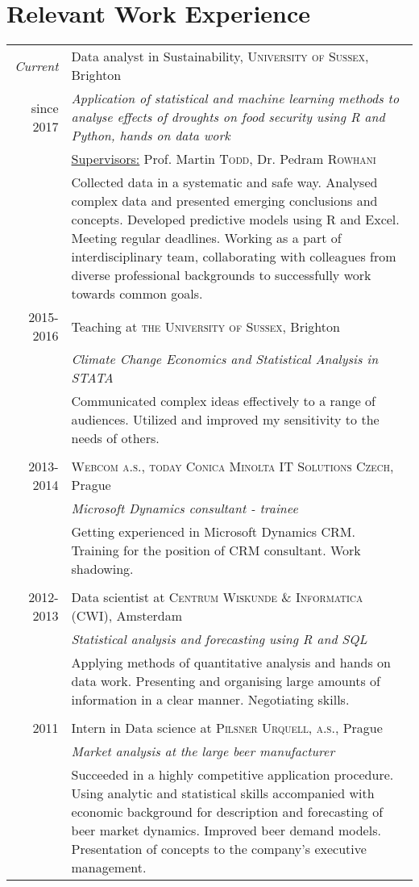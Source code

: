 \documentclass[a4paper,10pt]{article}
\begin{document}
\section{Relevant Work Experience}
\begin{tabular}{r|p{11cm}}
 \emph{Current} & Data analyst in Sustainability, \textsc{University of Sussex}, Brighton \\since \textsc{2017}&\emph{Application of statistical and machine learning methods to analyse effects of droughts on food security using R and Python, hands on data work}\\
& \underline{Supervisors:} Prof. Martin \textsc{Todd}, Dr. Pedram \textsc{Rowhani}\\
 &\footnotesize{Collected data in a systematic and safe way. Analysed complex data and presented emerging conclusions and concepts. Developed predictive models using R and Excel. Meeting regular deadlines. Working as a part of interdisciplinary team, collaborating with colleagues from diverse professional backgrounds to successfully work towards common goals.}

\\ \textsc{2015-2016} & Teaching at \textsc{the University of Sussex}, Brighton \\&\emph{Climate Change Economics and Statistical Analysis in STATA}\\&\footnotesize{Communicated complex ideas effectively to a range of audiences. Utilized and improved my sensitivity to the needs of others.}\\\multicolumn{2}{c}{} \\
 
  \textsc{2013-2014} &\textsc{Webcom a.s., today Conica Minolta IT Solutions Czech}, Prague\\ &\emph{Microsoft Dynamics consultant - trainee}\\&\footnotesize{Getting experienced in Microsoft Dynamics CRM. Training for the position of CRM consultant. Work shadowing.}\\\multicolumn{2}{c}{} \\


 \textsc{2012-2013} & Data scientist at \textsc{Centrum Wiskunde \& Informatica (CWI)}, Amsterdam\\ &\emph{Statistical analysis and forecasting using R and SQL}\\&\footnotesize{Applying methods of quantitative analysis and hands on data work. Presenting and organising large amounts of information in a clear manner. Negotiating skills.}\\\multicolumn{2}{c}{} \\


\textsc{2011} & Intern in Data science at \textsc{Pilsner Urquell, a.s.}, Prague\\ &\emph{Market analysis at the large beer manufacturer}\\&\footnotesize{Succeeded in a highly competitive application procedure. Using analytic and statistical skills accompanied with economic background for description and forecasting of beer market dynamics. Improved beer demand models. Presentation of concepts to the company's executive management.}
\end{tabular}
\end{document}
